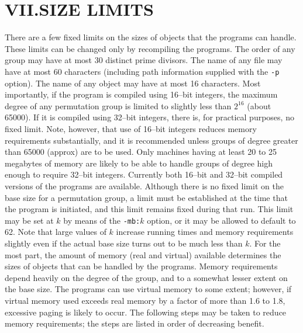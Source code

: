\section{VII.\quad SIZE LIMITS}
%
There are a few fixed limits on the sizes of objects that the programs can
handle.  These limits can be changed only by recompiling the programs.
The order of any group may have at most 30 distinct prime divisors.  The
name of any file may have at most 60 characters (including path information
supplied with the {\tt -p} option).   The name of any object may have at
most 16 characters.
Most importantly, if the program is compiled using 16--bit integers,
the maximum degree of any permutation group is limited to slightly less
than $2^{16}$ (about 65000).  If it is compiled using 32--bit integers,
there is, for practical purposes, no fixed limit.
Note, however, that use of 16--bit
integers reduces memory requirements substantially, and it is recommended
unless groups of degree greater than 65000 (approx) are to be used.
Only machines having at least 20 to 25 megabytes of memory are
likely to be able to handle groups of degree high enough to require 
32--bit integers.   Currently both 16--bit and 32--bit compiled versions 
of the programs are available.
\medbreak
Although there is no fixed limit on the base size for a permutation group,
a limit must be established at the time that the program is initiated, and
this limit remains fixed during that run.
This limit may be set at $k$ by means of the {\tt -mb:$k$} option, or it
may be allowed to default to 62.  Note that large values of $k$ increase 
running times and memory requirements slightly even if the actual base size 
turns out to be much less than $k$. 
\medbreak
For the most part, the amount of memory (real and virtual) available
determines the sizes of objects that can be handled by the programs.
Memory requirements depend heavily on the degree of the group, and 
to a somewhat lesser extent on the base size.
The programs can use virtual memory to some extent; however, if 
virtual memory used exceeds real memory by a factor of more than 1.6 to 1.8,
excessive paging is likely to occur.  The following steps may be taken
to reduce memory requirements; the steps are listed in order of decreasing
benefit.
